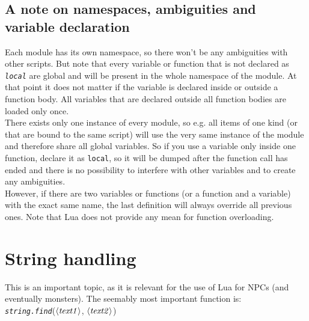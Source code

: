 \documentclass[a4paper,10pt,makeidx]{scrreprt}
\newcommand{\var}[1]{$\left\langle \text{\emph{#1}} \right\rangle$}
\newcommand{\lua}[1]{\index{#1}\texttt{\emph{#1}}}
\begin{document}
\section{A note on namespaces, ambiguities and variable declaration}
Each module has its own namespace, so there won't be any ambiguities with other scripts. But note that every variable or function that is not declared as \lua{local} are global and will be present in the whole namespace of the module. At that point it does not matter if the variable is declared inside or outside a function body. All variables that are declared outside all function bodies are loaded only once. \\
There exists only one instance of every module, so e.g. all items of one kind (or that are bound to the same script) will use the very same instance of the module and therefore share all global variables. So if you use a variable only inside one function, declare it as \texttt{local}, so it will be dumped after the function call has ended and there is no possibility to interfere with other variables and to create any ambiguities.
\\
However, if there are two variables or functions (or a function and a variable) with the exact same name, the last definition will always override all previous ones. Note that Lua does not provide any mean for function overloading.

\chapter{String handling}
This is an important topic, as it is relevant for the use of Lua for NPCs (and eventually monsters). The seemably most important function is:\\
\lua{string.find}(\var{text1}, \var{text2})
\end{document}
